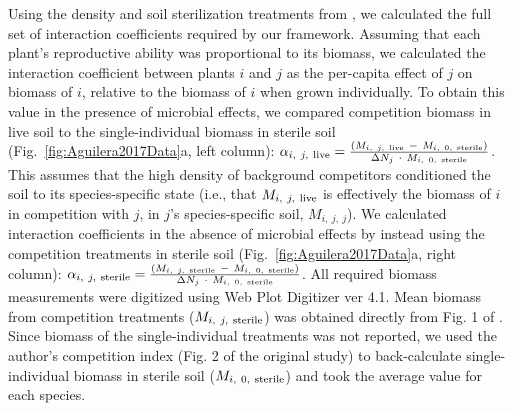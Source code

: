 Using the density and soil sterilization treatments from \citet{Aguilera2017}, we calculated the full set of interaction coefficients required by our framework. Assuming that each plant's reproductive ability was proportional to its biomass, we calculated the interaction coefficient between plants $i$ and $j$ as the per-capita effect of $j$ on biomass of $i$, relative to the biomass of $i$ when grown individually. To obtain this value in the presence of microbial effects, we compared competition biomass in live soil to the single-individual biomass in sterile soil (Fig.~\ref{fig:Aguilera2017Data}a, left column): $\alpha_{i,\ j,\ \textup{live}} = \frac{(M_{i,\ j,\ \textup{live}}\ -\ M_{i,\ 0,\ \textup{sterile}})}{\Delta N_{j}\ \cdot\  M_{i,\ 0,\ \textup{sterile}}}$.
This assumes that the high density of background competitors conditioned the soil to its species-specific state (i.e., that $M_{i,\ j,\ \textup{live}}$ is effectively the biomass of $i$ in competition with $j$, in $j$'s species-specific soil, $M_{i,\ j,\ j}$). We calculated interaction coefficients in the absence of microbial effects by instead using the competition treatments in sterile soil (Fig.~\ref{fig:Aguilera2017Data}a, right column):  $\alpha_{i,\ j,\ \textup{sterile}} = \frac{(M_{i,\ j,\ \textup{sterile}}\ -\ M_{i,\ 0,\ \textup{sterile}})}{\Delta N_{j}\ \cdot\  M_{i,\ 0,\ \textup{sterile}}}$.
All required biomass measurements were digitized using Web Plot Digitizer ver 4.1.
Mean biomass from competition treatments ($M_{i,\ j,\ \textup{sterile}}$) was obtained directly from Fig. 1 of \citealp{Aguilera2017}. Since biomass of the single-individual treatments was not reported, we used the author's competition index (Fig. 2 of the original study) to back-calculate single-individual biomass in sterile soil ($M_{i,\ 0,\ \textup{sterile}}$) and took the average value for each species.
\par


